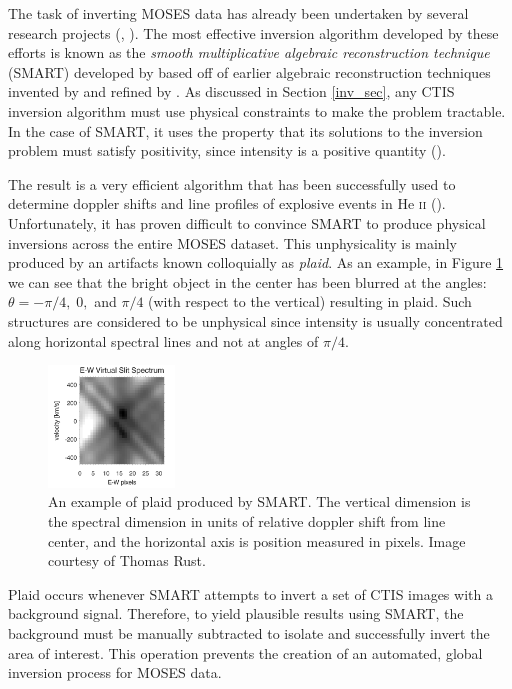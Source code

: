 \documentclass{article}
\begin{document}
			The task of inverting MOSES data has already been undertaken by several research projects (\cite{inversion}, \cite{fox1}). The most effective inversion algorithm developed by these efforts is known as the \textit{smooth multiplicative algebraic reconstruction technique} (SMART) developed by \cite{kankel2} based off of earlier algebraic reconstruction techniques invented by \cite{Gordon70} and refined by \cite{Okamoto:91}. As discussed in Section \ref{inv_sec}, any CTIS inversion algorithm must use physical constraints to make the problem tractable. In the case of SMART, it uses the property that its solutions to the inversion problem must satisfy positivity, since intensity is a positive quantity (\cite{kankel2}).
			
			The result is a very efficient algorithm that has been successfully used to determine doppler shifts and line profiles of explosive events in He \textsc{ii} (\cite{rust1}).
			Unfortunately, it has proven difficult to convince SMART to produce physical inversions across the entire MOSES dataset. This unphysicality is mainly produced by an artifacts known colloquially as \textit{plaid}. As an example, in Figure \ref{plaid} we can see that the bright object in the center has been blurred at the angles: $\theta=-\pi/4, \; 0,$ and $\pi/4$ (with respect to the vertical) resulting in plaid. Such structures are considered to be unphysical since intensity is usually concentrated along horizontal spectral lines and not at angles of $\pi/4$.
			\begin{figure}[h!]
				\centering
				\includegraphics[width=0.3\textwidth]{figures/plaid}
				\caption{An example of plaid produced by SMART. The vertical dimension is the spectral dimension in units of relative doppler shift from line center, and the horizontal axis is position measured in pixels. Image courtesy of Thomas Rust.}
				\label{plaid}
			\end{figure}
			
			Plaid occurs whenever SMART attempts to invert a set of CTIS images with a background signal. Therefore, to yield plausible results using SMART, the background must be manually subtracted to isolate and successfully invert the area of interest. This operation prevents the creation of an automated, global inversion process for MOSES data.
\end{document}
